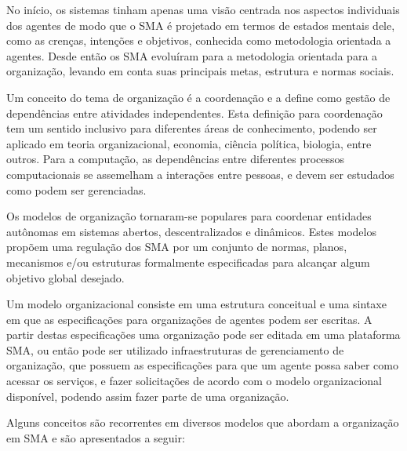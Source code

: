 No início, os sistemas tinham apenas uma visão centrada nos aspectos individuais dos agentes de modo que o SMA é projetado em termos de estados mentais dele, como as crenças, intenções e objetivos, conhecida como metodologia orientada a agentes. Desde então os SMA evoluíram para a metodologia orientada para a organização, levando em conta suas principais metas, estrutura e normas sociais\cite{argente2006multi}. 

Um conceito do tema de organização é a coordenação e \citet{malone1994interdisciplinary} a define como gestão de dependências entre atividades independentes. Esta definição para coordenação tem um sentido inclusivo para diferentes áreas de conhecimento, podendo ser aplicado em teoria organizacional, economia, ciência política, biologia, entre outros. Para a computação, as dependências entre diferentes processos computacionais se assemelham a interações entre pessoas, e devem ser estudados como podem ser gerenciadas.



Os modelos de organização tornaram-se populares para coordenar entidades autônomas em sistemas abertos, descentralizados e dinâmicos. Estes modelos propõem uma regulação dos SMA por um conjunto de normas, planos, mecanismos e/ou estruturas formalmente especificadas para alcançar algum objetivo global desejado.

Um modelo organizacional consiste em uma estrutura conceitual e uma sintaxe em que as especificações para organizações de agentes podem ser escritas. A partir destas especificações uma organização pode ser editada em uma plataforma SMA, ou então pode ser utilizado infraestruturas de gerenciamento de organização, que possuem as especificações para que um agente possa saber como acessar os serviços, e fazer solicitações de acordo com o modelo organizacional disponível, podendo assim fazer parte de uma organização.


Alguns conceitos são recorrentes em diversos modelos que abordam a organização em SMA e são apresentados a seguir:

